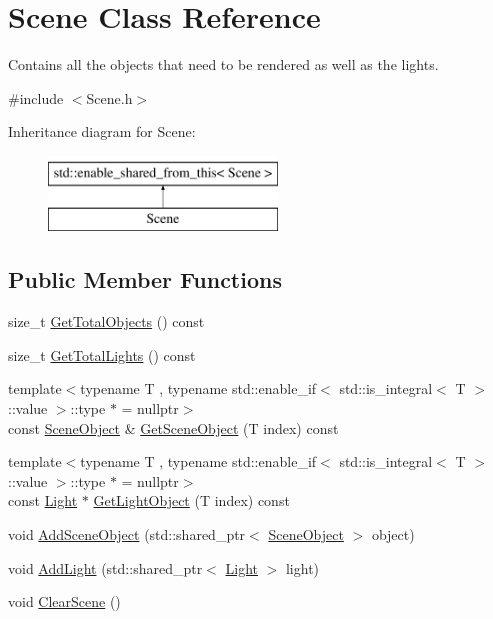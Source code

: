 \hypertarget{class_scene}{}\section{Scene Class Reference}
\label{class_scene}


Contains all the objects that need to be rendered as well as the lights.  




{\ttfamily \#include $<$Scene.\+h$>$}

Inheritance diagram for Scene\+:\begin{figure}[H]
\begin{center}
\leavevmode
\includegraphics[height=2.000000cm]{class_scene}
\end{center}
\end{figure}
\subsection*{Public Member Functions}
\begin{DoxyCompactItemize}
\item 
size\+\_\+t \hyperlink{class_scene_a23da430906feb967d70195ef26ba7a88}{Get\+Total\+Objects} () const 
\item 
size\+\_\+t \hyperlink{class_scene_ab9d522852e85884def3d10600106d724}{Get\+Total\+Lights} () const 
\item 
{\footnotesize template$<$typename T , typename std\+::enable\+\_\+if$<$ std\+::is\+\_\+integral$<$ T $>$\+::value $>$\+::type $\ast$  = nullptr$>$ }\\const \hyperlink{class_scene_object}{Scene\+Object} \& \hyperlink{class_scene_acfd7dbaefb2feb8233d2a07d497542d7}{Get\+Scene\+Object} (T index) const 
\item 
{\footnotesize template$<$typename T , typename std\+::enable\+\_\+if$<$ std\+::is\+\_\+integral$<$ T $>$\+::value $>$\+::type $\ast$  = nullptr$>$ }\\const \hyperlink{class_light}{Light} $\ast$ \hyperlink{class_scene_abb610e4c698b3c2ebfb922b5352eba36}{Get\+Light\+Object} (T index) const 
\item 
void \hyperlink{class_scene_a6e51f14c74c252d231b73d7109b8117e}{Add\+Scene\+Object} (std\+::shared\+\_\+ptr$<$ \hyperlink{class_scene_object}{Scene\+Object} $>$ object)
\item 
void \hyperlink{class_scene_ab9b1a906b16bf867600fc3f5b734c1d4}{Add\+Light} (std\+::shared\+\_\+ptr$<$ \hyperlink{class_light}{Light} $>$ light)
\item 
void \hyperlink{class_scene_ac3b0f6126be07f78a61abfac3487e4df}{Clear\+Scene} ()
\end{DoxyCompactItemize}
